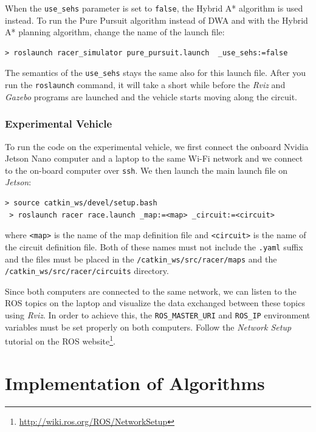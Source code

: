 When the \texttt{use\_sehs} parameter is set to \texttt{false}, the Hybrid A* algorithm is used instead. To run the Pure Pursuit algorithm instead of \gls*{DWA} and with the Hybrid A* planning algorithm, change the name of the launch file:

\begin{Verbatim}[fontsize=\small]
 > roslaunch racer_simulator pure_pursuit.launch  _use_sehs:=false
\end{Verbatim}

The semantics of the \texttt{use\_sehs} stays the same also for this launch file. After you run the \texttt{roslaunch} command, it will take a short while before the \textit{Rviz} and \textit{Gazebo} programs are launched and the vehicle starts moving along the circuit.

\subsubsection{Experimental Vehicle}

To run the code on the experimental vehicle, we first connect the onboard Nvidia Jetson Nano computer and a laptop to the same Wi-Fi network and we connect to the on-board computer over \texttt{ssh}. We then launch the main launch file on \textit{Jetson}:

\begin{Verbatim}[fontsize=\small]
 > source catkin_ws/devel/setup.bash
 > roslaunch racer race.launch _map:=<map> _circuit:=<circuit>
\end{Verbatim}

where \texttt{<map>} is the name of the map definition file and \texttt{<circuit>} is the name of the circuit definition file. Both of these names must not include the \texttt{.yaml} suffix and the files must be placed in the \texttt{/catkin\_ws/src/racer/maps} and the \texttt{/catkin\_ws/src/racer/circuits} directory.

Since both computers are connected to the same network, we can listen to the ROS topics on the laptop and visualize the data exchanged between these topics using \textit{Rviz}. In order to achieve this, the \texttt{ROS\_MASTER\_URI} and \texttt{ROS\_IP} environment variables must be set properly on both computers. Follow the \textit{Network Setup} tutorial on the \gls*{ROS} website\footnote{\url{http://wiki.ros.org/ROS/NetworkSetup}}.

\section{Implementation of Algorithms}

